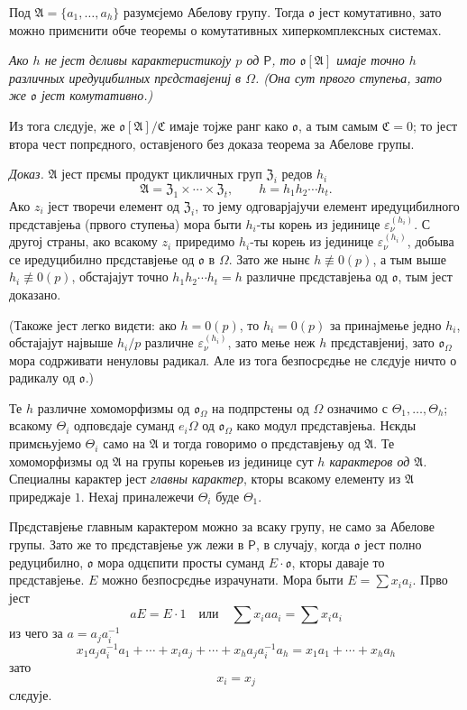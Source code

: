 \documentclass[11pt]{article}
\begin{document}
Под \(\mathfrak A=\{a_1,\ldots,a_h\}\) разумєјемо Абелову групу. Тогда \(\mathfrak o\) јест комутативно, зато можно примєнити обче теоремы о комутативных хиперкомплексных системах.

\emph{Ако \(h\) не јест дєливы карактеристикоју \(p\) од \(\mathsf P\), то \(\mathfrak o[\mathfrak A]\) имаје точно \(h\) различных иредуцибилных прєдставјениј в \(\Omega\). (Она сут првого ступења, зато же \(\mathfrak o\) јест комутативно.)}

Из тога слєдује, же \(\mathfrak o[\mathfrak A]/\mathfrak C\) имаје тојже ранг како \(\mathfrak o\), а тым самым \(\mathfrak C=0\); то јест втора чест попрєдного, оставјеного без доказа теорема за Абелове групы.

\emph{Доказ.} \(\mathfrak A\) јест прємы продукт цикличных груп \(\mathfrak Z_i\) редов \(h_i\)
\[
\mathfrak A=\mathfrak Z_1\times\cdots\times\mathfrak Z_t,\qquad
h=h_1h_2\cdots h_t .
\]
Ако \(z_i\) јест творечи елемент од \(\mathfrak Z_i\), то јему одговарјајучи елемент иредуцибилного прєдставјења (првого ступења) мора быти \(h_i\)-ты корењ из јединице \(\varepsilon_\nu^{(h_i)}\). С другој страны, ако всакому \(z_i\) приредимо \(h_i\)-ты корењ из јединице \(\varepsilon_\nu^{(h_i)}\), добыва се иредуцибилно прєдставјење од \(\mathfrak o\) в \(\Omega\). Зато же нынє \(h\not\equiv0(p)\), а тым выше \(h_i\not\equiv0(p)\), обстајајут точно \(h_1h_2\cdots h_t=h\) различне прєдставјења од \(\mathfrak o\), тым јест доказано.

(Такоже јест легко видєти: ако \(h=0(p)\), то \(h_i=0(p)\) за принајмење једно \(h_i\), обстајајут највыше \(h_i/p\) различне \(\varepsilon_\nu^{(h_i)}\), зато мење неж \(h\) прєдставјениј, зато \(\mathfrak o_\Omega\) мора содрживати ненуловы радикал. Але из тога безпосрєдње не слєдује ничто о радикалу од \(\mathfrak o\).)

Те \(h\) различне хомоморфизмы од \(\mathfrak o_\Omega\) на подпрстены од \(\Omega\) означимо с \(\Theta_1,\ldots,\Theta_h\); всакому \(\Theta_i\) одповєдаје суманд \(e_i\Omega\) од \(\mathfrak o_\Omega\) како модул прєдставјења. Нєкды примєњујемо \(\Theta_i\) само на \(\mathfrak A\) и тогда говоримо о прєдставјењу од \(\mathfrak A\). Те хомоморфизмы од \(\mathfrak A\) на групы корењев из јединице сут \emph{\(h\) карактеров од \(\mathfrak A\)}. Специалны карактер јест \emph{главны карактер}, кторы всакому елементу из \(\mathfrak A\) приреджаје \(1\). Нехај приналежечи \(\Theta_i\) буде \(\Theta_1\).

Прєдставјење главным карактером можно за всаку групу, не само за Абелове групы. Зато же то прєдставјење уж лежи в \(\mathsf P\), в случају, когда \(\mathfrak o\) јест полно редуцибилно, \(\mathfrak o\) мора одцєпити просты суманд \(E\cdot\mathfrak o\), кторы даваје то прєдставјење. \(E\) можно безпосрєдње израчунати. Мора быти \(E=\sum x_i a_i\). Прво јест
\[
aE=E\cdot 1\quad\text{или}\quad \sum x_i a a_i=\sum x_i a_i
\]
из чего за \(a=a_j a_i^{-1}\)
\[
x_1a_ja_i^{-1}a_1+\cdots+x_i a_j+\cdots+x_ha_ja_i^{-1}a_h
=x_1a_1+\cdots+x_ha_h
\]
зато
\[
x_i=x_j
\]
слєдује.
\end{document}
